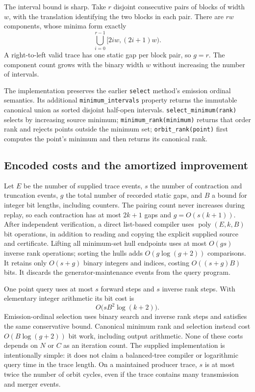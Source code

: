 The interval bound is sharp.  Take $r$ disjoint consecutive pairs of
blocks of width $w$, with the translation identifying the two blocks in
each pair.  There are $rw$ components, whose minima form exactly
\[
 \bigcup_{i=0}^{r-1}[2iw,(2i+1)w).
\]
A right-to-left valid trace has one static gap per block pair, so $g=r$.
The component count grows with the binary width $w$ without increasing
the number of intervals.

The implementation preserves the earlier \texttt{select} method's emission
ordinal semantics.  Its additional \texttt{minimum\_intervals} property
returns the immutable canonical union as sorted disjoint half-open intervals.
\texttt{select\_minimum(rank)} selects by increasing source minimum;
\texttt{minimum\_rank(minimum)} returns that order rank and rejects points
outside the minimum set; \texttt{orbit\_rank(point)} first computes the
point's minimum and then returns its canonical rank.

\subsection{Encoded costs and the amortized improvement}

Let $E$ be the number of supplied trace events, $s$ the number of contraction
and truncation events, $g$ the total number of recorded static gaps, and $B$
a bound for integer bit lengths, including counters.  The pairing count
never increases during replay, so each contraction has at most $2k+1$ gaps
and $g=O(s(k+1))$. After independent verification, a direct list-based compiler
uses $\operatorname{poly}(E,k,B)$ bit operations, in addition to reading and
copying the explicit supplied source and certificate.  Lifting all
minimum-set hull endpoints uses at most $O(gs)$ inverse rank operations;
sorting the hulls adds $O(g\log(g+2))$ comparisons.  It retains only
$O(s+g)$ binary integers and indices, costing $O((s+g)B)$ bits.  It discards
the generator-maintenance events from the query program.

One point query uses at most $s$ forward steps and $s$ inverse rank steps.
With elementary integer arithmetic its bit cost is
\[
 O\bigl(s B^2\log(k+2)\bigr).
\]
Emission-ordinal selection uses binary search and inverse rank steps and
satisfies the same conservative bound.  Canonical minimum rank and selection
instead cost $O(B\log(g+2))$ bit work, including output arithmetic.
None of these costs depends on $N$ or $C$ as an
iteration count.  The supplied implementation is intentionally simple:
it does not claim a balanced-tree compiler or logarithmic query time in
the trace length.  On a maintained producer trace, $s$ is at most twice
the number of orbit cycles, even if the trace contains many transmission
and merger events.

